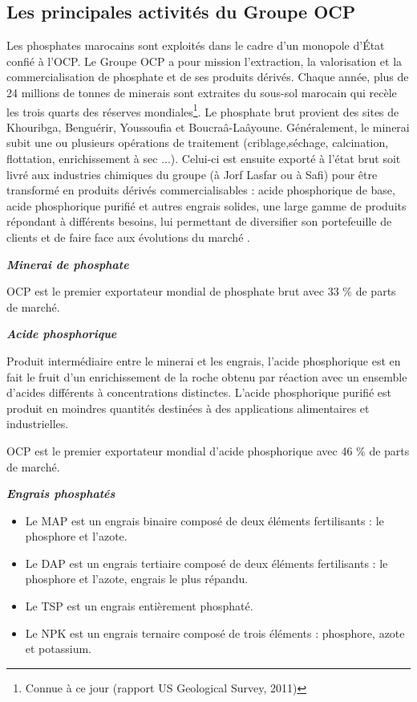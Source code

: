 	\subsection{Les principales activités du Groupe OCP}
	Les phosphates marocains sont exploités dans le cadre d'un monopole d'État confié à l'OCP.
	Le Groupe OCP a pour mission l'extraction, la valorisation et la commercialisation de
	phosphate et de ses produits dérivés. Chaque année, plus de 24 millions de tonnes de minerais
	sont extraites du sous-sol marocain qui recèle les trois quarts des réserves mondiales\footnote{Connue à ce jour (rapport US Geological Survey, 2011)}. Le phosphate brut provient des sites de Khouribga, Benguérir, Youssoufia et Boucraâ-Laâyoune. Généralement, le minerai subit une ou plusieurs opérations de traitement (criblage,séchage, calcination, flottation, enrichissement à sec ...). Celui-ci est ensuite exporté à l'état brut soit livré aux industries chimiques du groupe (à Jorf Lasfar ou à Safi) pour être transformé en produits dérivés commercialisables : acide phosphorique de base, acide phosphorique purifié et autres engrais solides, une large gamme de produits répondant à différents besoins, lui permettant de diversifier son portefeuille de clients
	et de faire face aux évolutions du marché \cite{NACER}.
		\par
		\textit{\textbf{Minerai de phosphate}}
		\par
		OCP est le premier exportateur mondial de phosphate brut avec 33 \% de parts de marché.
		\par
		\textit{\textbf{Acide phosphorique}} \par
		Produit intermédiaire entre le minerai et les engrais, l’acide phosphorique est en fait le fruit
		d’un enrichissement de la roche obtenu par réaction avec un ensemble d’acides différents à
		concentrations distinctes. L’acide phosphorique purifié est produit en moindres quantités destinées à des applications alimentaires et industrielles.\par OCP est le premier exportateur mondial d’acide phosphorique avec 46 \% de parts de marché.
		\par
			\textit{\textbf{Engrais phosphatés}} \par
		\begin{itemize}
		\item Le MAP est un engrais binaire composé de deux éléments fertilisants : le phosphore et l’azote.
		\item Le DAP est un engrais tertiaire composé de deux éléments fertilisants : le phosphore et l’azote, engrais le plus répandu.
		\item Le TSP est un engrais entièrement phosphaté.
		\item Le NPK est un engrais ternaire composé de trois éléments : phosphore, azote et potassium.
		\end{itemize}
